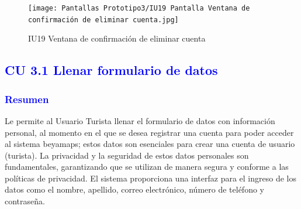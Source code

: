\begin{figure}[htbp]
        \centering
        \texttt{[image: Pantallas Prototipo3/IU19 Pantalla Ventana de confirmación de eliminar cuenta.jpg]}
        \caption{IU19 Ventana de confirmación de eliminar cuenta}
        \label{fig:enter-label}
        \vspace{200pt}
\end{figure}
\newpage



\subsection{\textcolor{blue}{CU 3.1 Llenar formulario de datos}}
\subsubsection{\textcolor{blue}{Resumen}}
             Le permite al Usuario Turista llenar el formulario de datos con información personal, al momento en el que se desea registrar una cuenta para poder acceder al sistema beyamaps; estos datos son esenciales para crear una cuenta de usuario (turista). La privacidad y la seguridad de estos datos personales son fundamentales, garantizando que se utilizan de manera segura y conforme a las políticas de privacidad. El sistema proporciona una interfaz para el ingreso de los datos como el nombre, apellido, correo electrónico, número de teléfono y contraseña.
             
